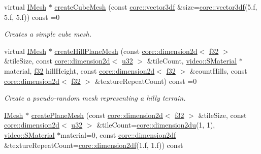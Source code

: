 \begin{DoxyCompactItemize}
virtual \hyperlink{classirr_1_1scene_1_1IMesh}{I\+Mesh} $\ast$ \hyperlink{classirr_1_1scene_1_1IGeometryCreator_a43a1310362ad8e682c21375b2b9de39b}{create\+Cube\+Mesh} (const \hyperlink{namespaceirr_1_1core_ae6e2b2a6c552833ebbd5b7463d03586b}{core\+::vector3df} \&size=\hyperlink{namespaceirr_1_1core_ae6e2b2a6c552833ebbd5b7463d03586b}{core\+::vector3df}(5.f, 5.f, 5.f)) const =0
\begin{DoxyCompactList}\small\item\em Creates a simple cube mesh. \end{DoxyCompactList}\item 
virtual \hyperlink{classirr_1_1scene_1_1IMesh}{I\+Mesh} $\ast$ \hyperlink{classirr_1_1scene_1_1IGeometryCreator_a85cb5d4271a1ef4ba1706b15f70ae391}{create\+Hill\+Plane\+Mesh} (const \hyperlink{classirr_1_1core_1_1dimension2d}{core\+::dimension2d}$<$ \hyperlink{namespaceirr_a0277be98d67dc26ff93b1a6a1d086b07}{f32} $>$ \&tile\+Size, const \hyperlink{classirr_1_1core_1_1dimension2d}{core\+::dimension2d}$<$ \hyperlink{namespaceirr_a0416a53257075833e7002efd0a18e804}{u32} $>$ \&tile\+Count, \hyperlink{classirr_1_1video_1_1SMaterial}{video\+::\+S\+Material} $\ast$material, \hyperlink{namespaceirr_a0277be98d67dc26ff93b1a6a1d086b07}{f32} hill\+Height, const \hyperlink{classirr_1_1core_1_1dimension2d}{core\+::dimension2d}$<$ \hyperlink{namespaceirr_a0277be98d67dc26ff93b1a6a1d086b07}{f32} $>$ \&count\+Hills, const \hyperlink{classirr_1_1core_1_1dimension2d}{core\+::dimension2d}$<$ \hyperlink{namespaceirr_a0277be98d67dc26ff93b1a6a1d086b07}{f32} $>$ \&texture\+Repeat\+Count) const =0
\begin{DoxyCompactList}\small\item\em Create a pseudo-\/random mesh representing a hilly terrain. \end{DoxyCompactList}\item 
\hyperlink{classirr_1_1scene_1_1IMesh}{I\+Mesh} $\ast$ \hyperlink{classirr_1_1scene_1_1IGeometryCreator_ad584dd294e44104452c4418d70223381}{create\+Plane\+Mesh} (const \hyperlink{classirr_1_1core_1_1dimension2d}{core\+::dimension2d}$<$ \hyperlink{namespaceirr_a0277be98d67dc26ff93b1a6a1d086b07}{f32} $>$ \&tile\+Size, const \hyperlink{classirr_1_1core_1_1dimension2d}{core\+::dimension2d}$<$ \hyperlink{namespaceirr_a0416a53257075833e7002efd0a18e804}{u32} $>$ \&tile\+Count=\hyperlink{namespaceirr_1_1core_a13e5bd7e47b2014eefc870ede11bbbbc}{core\+::dimension2du}(1, 1), \hyperlink{classirr_1_1video_1_1SMaterial}{video\+::\+S\+Material} $\ast$material=0, const \hyperlink{namespaceirr_1_1core_a54f0e5b7416e6dce5a0f6213f00a580f}{core\+::dimension2df} \&texture\+Repeat\+Count=\hyperlink{namespaceirr_1_1core_a54f0e5b7416e6dce5a0f6213f00a580f}{core\+::dimension2df}(1.f, 1.f)) const

\end{DoxyCompactItemize}
